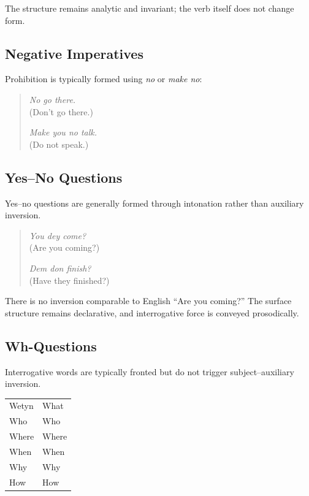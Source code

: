 \documentclass[12pt]{article}
\begin{document}
The structure remains analytic and invariant; the verb itself does not change form.

\subsection{Negative Imperatives}

Prohibition is typically formed using \textit{no} or \textit{make no}:

\begin{quote}
\textit{No go there.} \\
(Don't go there.)

\textit{Make you no talk.} \\
(Do not speak.)
\end{quote}

\subsection{Yes--No Questions}

Yes--no questions are generally formed through intonation rather than auxiliary inversion.

\begin{quote}
\textit{You dey come?} \\
(Are you coming?)

\textit{Dem don finish?} \\
(Have they finished?)
\end{quote}

There is no inversion comparable to English “Are you coming?” The surface structure remains declarative, and interrogative force is conveyed prosodically.

\subsection{Wh-Questions}

Interrogative words are typically fronted but do not trigger subject--auxiliary inversion.

\begin{center}
\begin{tabular}{ll}
Wetyn & What \\
Who & Who \\
Where & Where \\
When & When \\
Why & Why \\
How & How \\
\end{tabular}
\end{center}
\end{document}

